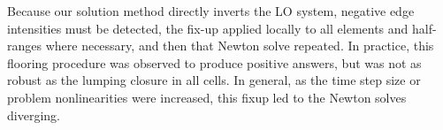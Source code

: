 Because our solution method directly inverts the LO system,
negative edge intensities must be detected, the fix-up applied locally to all elements and half-ranges
where necessary, and then that Newton solve
repeated.  In practice, this flooring procedure was observed to produce positive answers,
but was not as robust as the lumping closure in all cells.  In general, as the time step
size or problem nonlinearities were increased, this fixup led to the Newton
solves diverging.  




